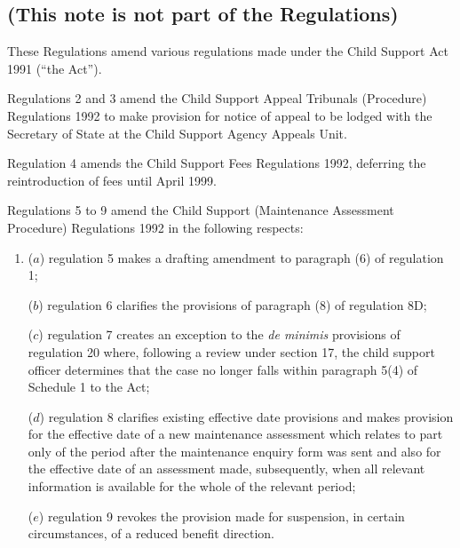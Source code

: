 \documentclass[12pt,a4paper]{article}
\begin{document}
\subsection*{(This note is not part of the Regulations)}

These Regulations amend various regulations made under the Child Support Act 1991 (“the Act”).

  Regulations 2 and 3 amend the Child Support Appeal Tribunals (Procedure) Regulations 1992 to make provision for notice of appeal to be lodged with the Secretary of State at the Child Support Agency Appeals Unit.

  Regulation 4 amends the Child Support Fees Regulations 1992, deferring the reintroduction of fees until April 1999.

 Regulations 5 to 9 amend the Child Support (Maintenance Assessment Procedure) Regulations 1992 in the following respects:
\begin{enumerate}\item[]
 ($a$) regulation 5 makes a drafting amendment to paragraph (6) of regulation 1;

 ($b$) regulation 6 clarifies the provisions of paragraph (8) of regulation 8D;

 ($c$) regulation 7 creates an exception to the \emph{de minimis} provisions of regulation 20 where, following a review under section 17, the child support officer determines that the case no longer falls within paragraph 5(4) of Schedule 1 to the Act;

 ($d$) regulation 8 clarifies existing effective date provisions and makes provision for the effective date of a new maintenance assessment which relates to part only of the period after the maintenance enquiry form was sent and also for the effective date of an assessment made, subsequently, when all relevant information is available for the whole of the relevant period;

 ($e$) regulation 9 revokes the provision made for suspension, in certain circumstances, of a reduced benefit direction.
\end{enumerate}
\end{document}
